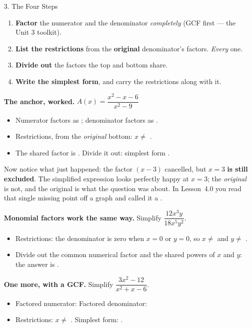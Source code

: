 \documentclass[10pt]{article}
\begin{document}
\begin{notesbox}{3. The Four Steps}
\begin{enumerate}[leftmargin=1.9em, itemsep=2pt]
  \item \textbf{Factor} the numerator and the denominator \emph{completely} (GCF first --- the Unit 3 toolkit).
  \item \textbf{List the restrictions} from the \textbf{original} denominator's factors. \emph{Every} one.
  \item \textbf{Divide out} the factors the top and bottom share.
  \item \textbf{Write the simplest form}, and carry the restrictions along with it.
\end{enumerate}

\vspace{4pt}
\textbf{The anchor, worked.} $A(x)=\dfrac{x^2-x-6}{x^2-9}$
\begin{itemize}[leftmargin=1.5em, itemsep=3pt]
  \item Numerator factors as ; \; denominator factors as .
  \item Restrictions, from the \emph{original} bottom: $x\neq$ .
  \item The shared factor is . Divide it out: simplest form .
\end{itemize}

\vspace{3pt}
Now notice what just happened: the factor $(x-3)$ cancelled, but $x=3$ \textbf{is still excluded}. The
simplified expression looks perfectly happy at $x=3$; the \emph{original} is not, and the original is
what the question was about. In Lesson~4.0 you read that single missing point off a graph and called
it a .

\vspace{5pt}
\textbf{Monomial factors work the same way.} Simplify $\dfrac{12x^3y}{18x^5y^2}$.
\begin{itemize}[leftmargin=1.5em, itemsep=3pt]
  \item Restrictions: the denominator is zero when $x=0$ or $y=0$, so $x\neq$  and
        $y\neq$ .
  \item Divide out the common numerical factor  and the shared powers of $x$ and $y$:
        the answer is .
\end{itemize}

\vspace{4pt}
\textbf{One more, with a GCF.} Simplify $\dfrac{3x^2-12}{x^2+x-6}$.
\begin{itemize}[leftmargin=1.5em, itemsep=3pt]
  \item Factored numerator:  \quad Factored denominator: 
  \item Restrictions: $x\neq$ . \quad Simplest form: .
\end{itemize}
\end{notesbox}
\end{document}
